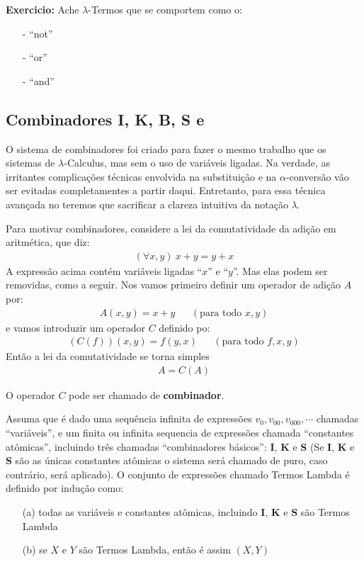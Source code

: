 \documentclass[12pt, a4paper]{article}
\begin{document}
\textbf{Exercicio:}  Ache $\lambda$-Termos que se comportem como o: 
\begin{itemize}
\item[-] ``not''
\item[-] ``or''
\item[-] ``and''
\end{itemize}

\subsection{Combinadores I, K, B, S \cite{book:111321} e \cite{stenlund2012combinators}}
O sistema de combinadores foi criado para fazer o mesmo trabalho que os sistemas de $\lambda$-Calculus, mas sem o uso de variáveis ligadas. Na verdade, as irritantes complicações técnicas envolvida na substituição e na $\alpha$-conversão vão ser evitadas completamentes a partir daqui. Entretanto, para essa técnica avançada no teremos que sacrificar a clareza intuitiva da notação $\lambda$.

Para motivar combinadores, considere a lei da comutatividade da adição em aritmética, que diz:
\begin{align*}
(\forall x,y)~x+y = y + x
\end{align*}  
A expressão acima contém variáveis ligadas ``$x$'' e ``$y$''. Mas elas podem ser removidas, como a seguir. Nos vamos primeiro definir um operador de adição $A$ por:
\begin{align*}
A(x,y) = x + y && (\text{para todo } x,y)
\end{align*}
e vamos introduzir um operador $C$ definido po:
\begin{align*}
(C(f))(x,y) = f(y,x) && (\text{para todo } f,x,y)
\end{align*}
Então a lei da comutatividade se torna simples
\begin{align*}
A = C(A)
\end{align*}

O operador $C$ pode ser chamado de \textbf{combinador}.

Assuma que é dado uma sequência infinita de expressões $v_0, v_00, v_000, \cdots$ chamadas ``variáveis'', e um finita ou infinita sequencia de expressões chamada ``constantes atômicas'', incluindo três chamadas ``combinadores básicos'': \textbf{I}, \textbf{K} e \textbf{S} (Se \textbf{I}, \textbf{K} e \textbf{S} são as únicas constantes atômicas o sistema será chamado de puro, caso contrário, será aplicado). O conjunto de expressões chamado Termos Lambda é definido por indução como:
\begin{itemize}
\item[(a)] todas as variáveis e constantes atômicas, incluindo \textbf{I}, \textbf{K} e \textbf{S} são Termos Lambda
\item[(b)] se $X$ e $Y$ são Termos Lambda, então é assim $(X,Y)$
\end{itemize}
\end{document}
